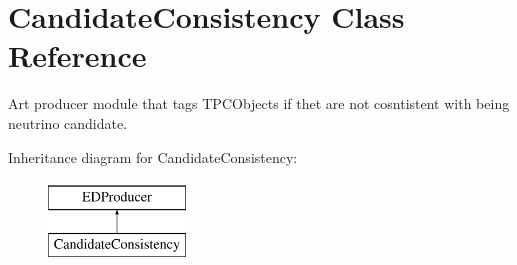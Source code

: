 \hypertarget{classCandidateConsistency}{\section{Candidate\-Consistency Class Reference}
\label{classCandidateConsistency}
}


Art producer module that tags T\-P\-C\-Objects if thet are not cosntistent with being neutrino candidate.  


Inheritance diagram for Candidate\-Consistency\-:\begin{figure}[H]
\begin{center}
\leavevmode
\includegraphics[height=2.000000cm]{classCandidateConsistency}
\end{center}
\end{figure}

